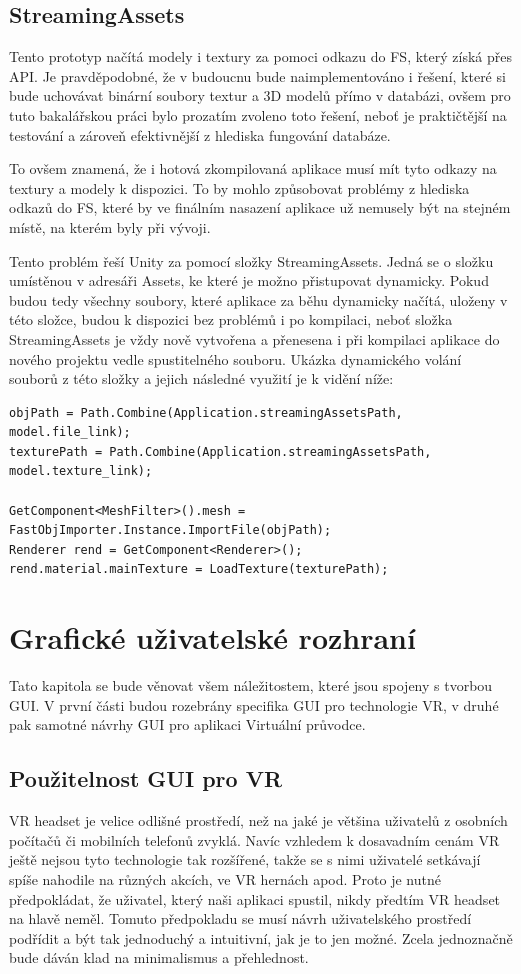 \documentclass[thesis=B,czech]{FITthesis}[2012/06/26]
\begin{document}
        
    \subsection{StreamingAssets}
Tento prototyp načítá modely i textury za pomoci odkazu do FS, který získá přes API. Je pravděpodobné, že v budoucnu bude naimplementováno i řešení, které si bude uchovávat binární soubory textur a 3D modelů přímo v databázi, ovšem pro tuto bakalářskou práci bylo prozatím zvoleno toto řešení, neboť je praktičtější na testování a zároveň efektivnější z hlediska fungování databáze.

To ovšem znamená, že i hotová zkompilovaná aplikace musí mít tyto odkazy na textury a modely k dispozici. To by mohlo způsobovat problémy z hlediska odkazů do FS, které by ve finálním nasazení aplikace už nemusely být na stejném místě, na kterém byly při vývoji.

Tento problém řeší Unity za pomocí složky StreamingAssets. Jedná se o složku umístěnou v adresáři Assets, ke které je možno přistupovat dynamicky. Pokud budou tedy všechny soubory, které aplikace za běhu dynamicky načítá, uloženy v této složce, budou k dispozici bez problémů i po kompilaci, neboť složka StreamingAssets je vždy nově vytvořena a přenesena i při kompilaci aplikace do nového projektu vedle spustitelného souboru. Ukázka dynamického volání souborů z této složky a jejich následné využití je k vidění níže:

\begin{lstlisting}[frame=single]
objPath = Path.Combine(Application.streamingAssetsPath, model.file_link);
texturePath = Path.Combine(Application.streamingAssetsPath, model.texture_link);

GetComponent<MeshFilter>().mesh = FastObjImporter.Instance.ImportFile(objPath);
Renderer rend = GetComponent<Renderer>();
rend.material.mainTexture = LoadTexture(texturePath);
\end{lstlisting}


	\section{Grafické uživatelské rozhraní}
	\label{sec:GUI}
	
	Tato kapitola se bude věnovat všem náležitostem, které jsou spojeny s tvorbou GUI. V první části budou rozebrány specifika GUI pro technologie VR, v druhé pak samotné návrhy GUI pro aplikaci Virtuální průvodce.
	
	
	\subsection{Použitelnost GUI pro VR}
VR headset je velice odlišné prostředí, než na jaké je většina uživatelů z osobních počítačů či mobilních telefonů zvyklá. Navíc vzhledem k dosavadním cenám VR ještě nejsou tyto technologie tak rozšířené, takže se s nimi uživatelé setkávají spíše nahodile na různých akcích, ve VR hernách apod. Proto je nutné předpokládat, že uživatel, který naši aplikaci spustil, nikdy předtím VR headset na hlavě neměl. Tomuto předpokladu se musí návrh uživatelského prostředí podřídit a být tak jednoduchý a intuitivní, jak je to jen možné. Zcela jednoznačně bude dáván klad na minimalismus a přehlednost.
	
\end{document}
